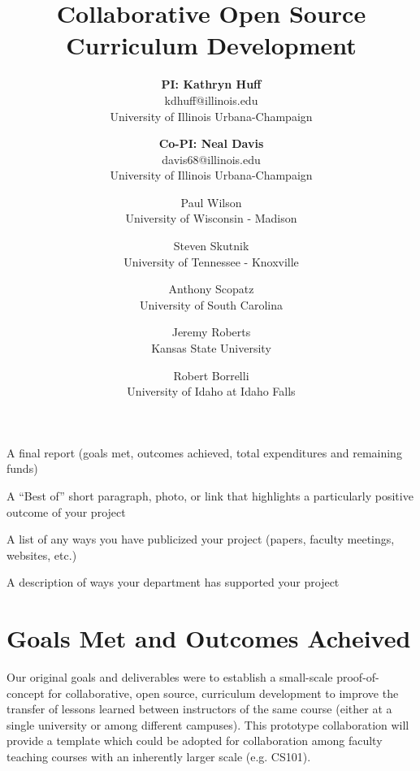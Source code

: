 \documentclass[11pt]{article}
\newcommand{\authorsite}{arfc.npre.illinois.edu}
\begin{document}
          \title{Collaborative Open Source Curriculum Development}
          \author{\textbf{PI: Kathryn Huff}\\
                  kdhuff@illinois.edu\\
                  University of Illinois Urbana-Champaign
                  \and
\textbf{Co-PI: Neal Davis}\\davis68@illinois.edu\\University of Illinois Urbana-Champaign
\and
Paul Wilson\\University of Wisconsin - Madison 
\and
          Steven Skutnik\\University of Tennessee - Knoxville
\and
          Anthony Scopatz\\University of South Carolina 
\and
          Jeremy Roberts\\Kansas State University 
\and
          Robert Borrelli\\University of Idaho at Idaho Falls
}
          \maketitle

          \pagestyle{fancy}
          \lhead{\textcolor{gray}{SIIP Close-Out Report}}
          \rhead{\textcolor{gray}{Collaborative Open Source Curriculum Development}}
          \renewcommand{\headrulewidth}{0pt}
          \renewcommand{\footrulewidth}{0pt}

A final report (goals met, outcomes
achieved, total expenditures and
remaining funds)

A “Best of” short paragraph, photo, or
link that highlights a particularly
positive outcome of your project

A list of any ways you have publicized
your project (papers, faculty meetings,
websites, etc.)

A description of ways your department
has supported your project

          \section{Goals Met and Outcomes Acheived}
          Our original goals and deliverables were to establish a small-scale 
          proof-of-concept for collaborative, open source, curriculum 
          development to improve the transfer of lessons learned between 
          instructors of the same course (either at a single university or 
          among different campuses). This prototype collaboration will provide 
          a template which could be adopted for collaboration among faculty 
          teaching courses with an inherently larger scale (e.g.  CS101).
\end{document}
